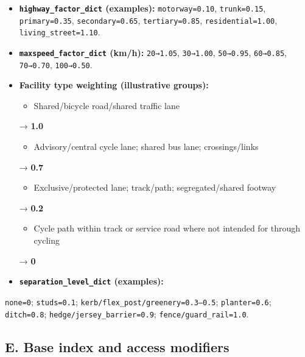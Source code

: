 \documentclass[
  12pt,
  oneside]{book}
\providecommand{\tightlist}{%
  \setlength{\itemsep}{0pt}\setlength{\parskip}{0pt}}
\begin{document}
\begin{itemize}
\item
  \textbf{\texttt{highway\_factor\_dict} (examples):} \texttt{motorway=0.10}, \texttt{trunk=0.15}, \texttt{primary=0.35}, \texttt{secondary=0.65}, \texttt{tertiary=0.85}, \texttt{residential=1.00}, \texttt{living\_street=1.10}.
\item
  \textbf{\texttt{maxspeed\_factor\_dict} (km/h):} \texttt{20→1.05}, \texttt{30→1.00}, \texttt{50→0.95}, \texttt{60→0.85}, \texttt{70→0.70}, \texttt{100→0.50}.
\item
  \textbf{Facility type weighting (illustrative groups):}

  \begin{itemize}
  \tightlist
  \item
    Shared/bicycle road/shared traffic lane
  \end{itemize}

  → \textbf{1.0}

  \begin{itemize}
  \tightlist
  \item
    Advisory/central cycle lane; shared bus lane; crossings/links
  \end{itemize}

  → \textbf{0.7}

  \begin{itemize}
  \tightlist
  \item
    Exclusive/protected lane; track/path; segregated/shared footway
  \end{itemize}

  → \textbf{0.2}

  \begin{itemize}
  \tightlist
  \item
    Cycle path within track or service road where not intended for through cycling
  \end{itemize}

  → \textbf{0}
\item
  \textbf{\texttt{separation\_level\_dict} (examples):}
\end{itemize}

\texttt{none=0}; \texttt{studs=0.1}; \texttt{kerb/flex\_post/greenery=0.3–0.5}; \texttt{planter=0.6}; \texttt{ditch=0.8}; \texttt{hedge/jersey\_barrier=0.9}; \texttt{fence/guard\_rail=1.0}.

\subsection*{E. Base index and access modifiers}\label{e.-base-index-and-access-modifiers}
\end{document}
